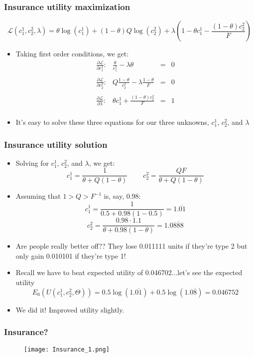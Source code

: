 \documentclass{beamer}
\begin{document}
\begin{frame}
\frametitle{Insurance utility maximization}
$$\mathcal{L}(c_1^1,c_2^2,\lambda)=\theta \log(c_1^1)+(1-\theta)Q\log(c_2^2)+\lambda\left(1-\theta c_1^1-\frac{(1-\theta)c_2^2}{F}\right)$$
\begin{itemize}
\item Taking first order conditions, we get:
$$\begin{array}{lrcl}
\frac{\partial \mathcal{L}}{\partial c_1^1}: & \frac{\theta}{c_1^1}-\lambda\theta & = & 0 \\
\ \\
\frac{\partial \mathcal{L}}{\partial c_2^2}: & Q\frac{1-\theta}{c_2^2}-\lambda\frac{1-\theta}{F} & = & 0 \\
\ \\
\frac{\partial \mathcal{L}}{\partial \lambda}: & \theta c_1^1 + \frac{(1-\theta)c_2^2}{F}  & = & 1 \\
\end{array}$$
\bigskip
\item It's easy to solve these three equations for our three unknowns, $c_1^1$, $c_2^2$, and $\lambda$
\end{itemize}
\end{frame}

\begin{frame}
\frametitle{Insurance utility solution}
\begin{itemize}
\item Solving for $c_1^1$, $c_2^2$, and $\lambda$, we get:
$$c_1^1=\frac{1}{\theta+Q(1-\theta)}\ \ \ \ \ \ \ \ \ \ c_2^2=\frac{QF}{\theta+Q(1-\theta)}$$
\item<2-> Assuming that $1>Q>F^{-1}$ is, say, 0.98:
$$c_1^1=\frac{1}{0.5+0.98(1-0.5)}=1.\overline{01}$$
$$c_2^2=\frac{0.98\cdot 1.1}{\theta+0.98(1-\theta)}=1.0\overline{888}$$
\item<3-> Are people really better off?? They lose 0.011111 units if they're type 2 but only gain 0.010101 if they're type 1!
\item<4-> Recall we have to beat expected utility of 0.046702...let's see the expected utility
$$E_0(U(c_1^1,c_2^2,\Theta))=0.5\log(1.\overline{01})+0.5\log(1.0\overline{8})=0.046752$$
\item<5-> We did it!  Improved utility slightly.
\end{itemize}
\end{frame}

\begin{frame}
\frametitle{Insurance?}
\begin{figure}
\centering
\texttt{[image: Insurance\_1.png]}
\end{figure}
\end{frame}
\end{document}
